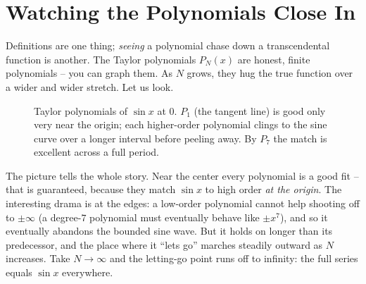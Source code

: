 \section{Watching the Polynomials Close In}
\label{ch30:sec-watching}

Definitions are one thing; \emph{seeing} a polynomial chase down a transcendental function is another. The Taylor polynomials $P_N(x)$ are honest, finite polynomials -- you can graph them. As $N$ grows, they hug the true function over a wider and wider stretch. Let us look.

\begin{figure}[H]
\centering
{}
\caption{Taylor polynomials of $\sin x$ at $0$. $P_1$ (the tangent line) is good only very near the origin; each higher-order polynomial clings to the sine curve over a longer interval before peeling away. By $P_7$ the match is excellent across a full period.}
\label{ch30:fig-sin-taylor}
\end{figure}

The picture tells the whole story. Near the center every polynomial is a good fit -- that is guaranteed, because they match $\sin x$ to high order \emph{at the origin}. The interesting drama is at the edges: a low-order polynomial cannot help shooting off to $\pm\infty$ (a degree-$7$ polynomial must eventually behave like $\pm x^7$), and so it eventually abandons the bounded sine wave. But it holds on longer than its predecessor, and the place where it ``lets go'' marches steadily outward as $N$ increases. Take $N\to\infty$ and the letting-go point runs off to infinity: the full series equals $\sin x$ everywhere.

